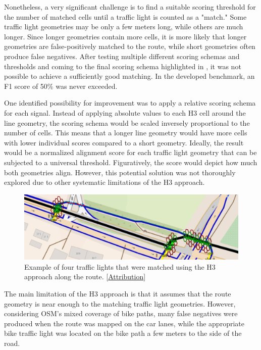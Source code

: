 Nonetheless, a very significant challenge is to find a suitable scoring threshold for the number of matched cells until a traffic light is counted as a "match." Some traffic light geometries may be only a few meters long, while others are much longer. Since longer geometries contain more cells, it is more likely that longer geometries are false-positively matched to the route, while short geometries often produce false negatives. After testing multiple different scoring schemas and thresholds and coming to the final scoring schema highlighted in , it was not possible to achieve a sufficiently good matching. In the developed benchmark, an F1 score of 50\% was never exceeded. 

One identified possibility for improvement was to apply a relative scoring schema for each signal. Instead of applying absolute values to each H3 cell around the line geometry, the scoring schema would be scaled inversely proportional to the number of cells. This means that a longer line geometry would have more cells with lower individual scores compared to a short geometry. Ideally, the result would be a normalized alignment score for each traffic light geometry that can be subjected to a universal threshold. Figuratively, the score would depict how much both geometries align. However, this potential solution was not thoroughly explored due to other systematic limitations of the H3 approach.

\begin{figure}[htbp]
\centering
\includegraphics[width=\linewidth]{images/sg-selection-h3-example.png}
\caption{Example of four traffic lights that were matched using the H3 approach along the route. [\hyperref[attribution]{Attribution}]}
\label{fig:sg-selection-h3-example}
\end{figure}

The main limitation of the H3 approach is that it assumes that the route geometry is near enough to the matching traffic light geometries. However, considering OSM's mixed coverage of bike paths, many false negatives were produced when the route was mapped on the car lanes, while the appropriate bike traffic light was located on the bike path a few meters to the side of the road. 

